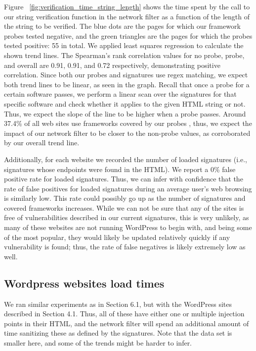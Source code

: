  Figure ~\ref{fig:verification_time_string_length} shows the time spent by the call to our string verification function in the network filter as a function of the length of the string to be verified. The blue dots are the pages for which our framework probes tested negative, and the green triangles are the pages for which the probes tested positive: 55 in total. We applied least squares regression to calculate the shown trend lines. The Spearman's rank correlation values for no probe, probe, and overall are 0.91, 0.91, and 0.72 respectively, demonstrating positive correlation. Since both our probes and signatures use regex matching, we expect both trend lines to be linear, as seen in the graph. Recall that once a probe for a certain software passes, we perform a linear scan over the signatures for that specific software and check whether it applies to the given HTML string or not. Thus, we expect the slope of the line to be higher when a probe passes. Around 37.4\% of all web sites use frameworks covered by our probes \cite{w3stats}, thus, we expect the impact of our network filter to be closer to the non-probe values, as corroborated by our overall trend line.

Additionally, for each website we recorded the number of loaded signatures (i.e., signatures whose endpoints were found in the HTML). We report a 0\% false positive rate for loaded signatures. Thus, we can infer with confidence that the rate of false positives for loaded signatures during an average user's web browsing is similarly low. This rate could possibly go up as the number of signatures and covered frameworks increases. While we can not be sure that any of the sites is free of vulnerabilities described in our current signatures, this is very unlikely, as many of these websites are not running WordPress to begin with, and being some of the most popular, they would likely be updated relatively quickly if any vulnerability is found; thus, the rate of false negatives is likely extremely low as well.

\subsection{Wordpress websites load times} \label{wordpress_sites}

We ran similar experiments as in Section 6.1, but with the WordPress sites described in Section 4.1. Thus, all of these have either one or multiple injection points in their HTML, and the network filter will spend an additional amount of time sanitizing these as defined by the signatures. Note that the data set is smaller here, and some of the trends might be harder to infer. 

